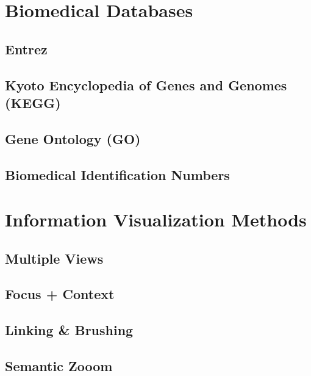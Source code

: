 \section{Biomedical Databases}



\subsection{Entrez}


\subsection{Kyoto Encyclopedia of Genes and Genomes (KEGG)}


\subsection{Gene Ontology (GO)}

\subsection{Biomedical Identification Numbers}

\section{Information Visualization Methods}

\subsection{Multiple Views}
\subsection{Focus + Context}
\subsection{Linking \& Brushing}
\subsection{Semantic Zooom}
